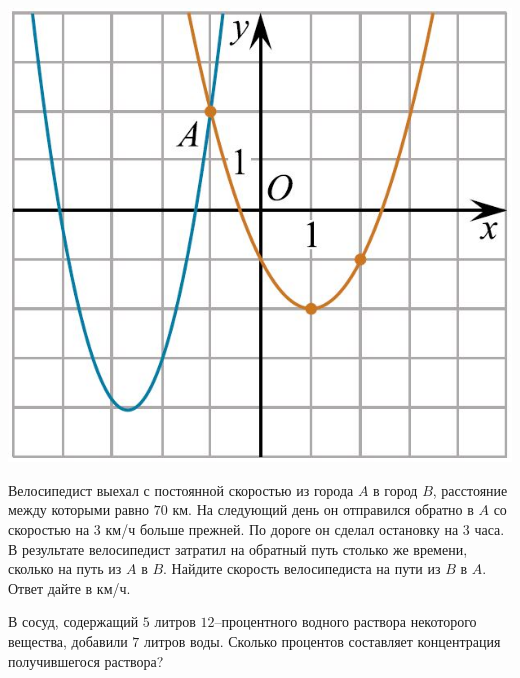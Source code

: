 \begin{class}[number=8]
\begin{listofex}
\begin{minipage}[c]{0.3\textwidth}
			\includegraphics[align=t, width=\textwidth]{pics/G112M3C2-6}
		\end{minipage}
		\item Велосипедист выехал с постоянной скоростью из города \( A \) в город \( B \), расстояние между
		которыми равно \( 70 \) км. На следующий день он отправился обратно в \( A \) со скоростью на \( 3 \) км/ч больше прежней. По дороге он сделал остановку на \( 3 \) часа. В результате велосипедист затратил на обратный путь столько же времени, сколько на путь из \( A \) в \( B \). Найдите скорость велосипедиста на пути из \( B \) в \( A \). Ответ дайте в км/ч.
		\item В сосуд, содержащий \( 5 \) литров \( 12 \)--процентного водного раствора некоторого вещества,
		добавили \( 7 \) литров воды. Сколько процентов составляет концентрация получившегося раствора?
	\end{listofex}
\end{class}